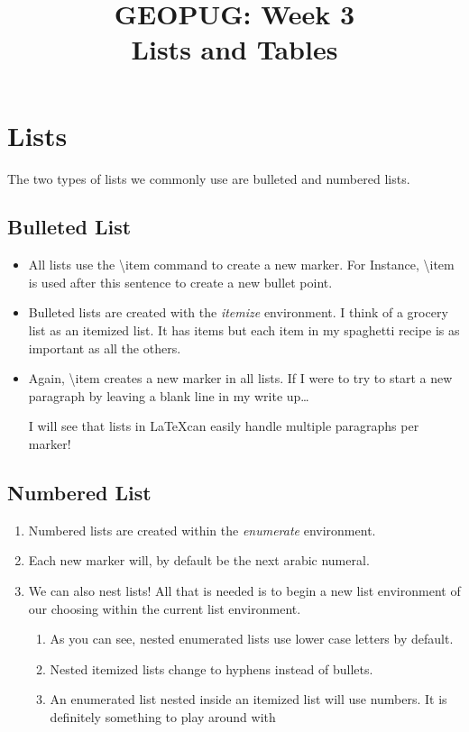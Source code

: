 \documentclass[12pt]{article}
\title{GEOPUG: Week 3\\Lists and Tables}
\date{}
\begin{document}
\maketitle

\section{Lists}

The two types of lists we commonly use are bulleted and numbered lists.

\subsection{Bulleted List}

\begin{itemize} %
\item %
All lists use the \textbackslash item command to create a new marker. For Instance, \textbackslash item is used after this sentence to create a new bullet point.

\item Bulleted lists are created with the \textit{itemize} environment. I think of a grocery list as an itemized list. It has items but each item in my spaghetti recipe is as important as all the others.

\item Again, \textbackslash item creates a new marker in all lists. If I were to try to start a new paragraph by leaving a blank line in my write up\dots

I will see that lists in \LaTeX can easily handle multiple paragraphs per marker!
\end{itemize}

\subsection{Numbered List}

\begin{enumerate} %
	\item Numbered lists are created within the \textit{enumerate} environment. 
	\item Each new marker will, by default be the next arabic numeral.
	\item We can also nest lists! All that is needed is to begin a new list environment of our choosing within the current list environment.
	
	\begin{enumerate} %
		\item As you can see, nested enumerated lists use lower case letters by default.
		\item Nested itemized lists change to hyphens instead of bullets.
		\item An enumerated list nested inside an itemized list will use numbers. It is definitely something to play around with
	\end{enumerate}
	
\end{enumerate}
\end{document}
